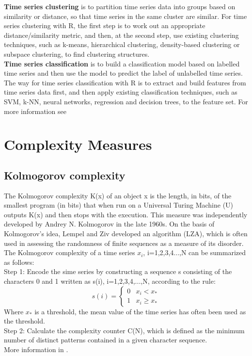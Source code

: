 \documentclass[twoside, english]{article}
\begin{document}
\begin{multicols}{2}
\textbf{Time series clustering} is to partition time series data into groups based on similarity or distance, so that time series in the same cluster are similar. For time series clustering with R, the first step is to work out an appropriate distance/similarity metric, and then, at the second step, use existing clustering techniques, such as k-means, hierarchical clustering, density-based clustering or subspace clustering, to find clustering structures.\\ \textbf{Time series classification} is to build a classification model based on labelled time series and then use the model to predict the label of unlabelled time series. The way for time series classification with R is to extract and build features from time series data first, and then apply existing classification techniques, such as SVM, k-NN, neural networks, regression and decision trees, to the feature set. For more information see \cite{web:clustering_classification}


\section{Complexity Measures} \label{complexity}

\subsection{Kolmogorov complexity} \label{kolmogorov}

The Kolmogorov complexity K(x) of an object x is the length, in bits, of the smallest program (in bits) that when run on a Universal Turing Machine (U) outputs K(x) and then stops with the execution. This measure was independently developed by Andrey N. Kolmogorov in the late 1960s. On the basis of Kolmogorov’s idea, Lempel and Ziv developed an algorithm (LZA), which is often used in assessing the randomness of finite sequences as a measure of its disorder.\\
The Kolmogorov complexity of a time series \(x_{i}\), i=1,2,3,4...,N can be summarized as follows:\\
Step 1: Encode the sime series by constructing a sequence s consisting of the characters 0 and 1 written as s(i), i=1,2,3,4,...,N, according to the rule:
$$s(i)= \left\{ 
\begin{array}{lcc}
0 & x_{i} < x_{*} \\
1 & x_{i} \geq x_{*} 
\end{array}
\right.
$$
Where \(x_{*}\) is a threshold, the mean value of the time series has often been used as the threshold.\\
Step 2: Calculate the complexity counter C(N), which is defined as the minimum number of distinct patterns contained in a given character sequence.\\
More information in \cite{article:KolmogorovComplexity} \cite{wiki:kolmogorov} \cite{article:EasilyAdaptableComplexityMeasure}.


\end{multicols}
\end{document}
